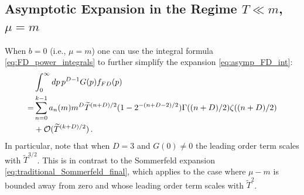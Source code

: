\documentclass[sn-mathphys,Numbered]{sn-jnl}
\begin{document}
\subsection{Asymptotic Expansion in the Regime $T\ll m$, $\mu=m$}\label{sec:b_0}
When $b=0$ (i.e., $\mu=m$) one can use the integral formula \eqref{eq:FD_power_integrals} to further simplify the expansion \eqref{eq:asymp_FD_int}:
\begin{align}\label{eq:asymp_FD_int_b_0}
&\int_0^\infty dp\, p^{D-1} G(p) f_{FD}(p)\notag\\
   =&\sum_{n=0}^{k-1} a_n(m)m^{D}\widetilde{T}^{(n+D)/2}(1-2^{-(n+D-2)/2})\Gamma((n+D)/2)\zeta((n+D)/2)\\
   &+\mathcal{O}(\widetilde{T}^{(k+D)/2})\,.\notag
\end{align}
In particular, note that when $D=3$ and $G(0)\neq 0$ the leading order term scales with $\widetilde{T}^{3/2}$.  This is in contrast to the  Sommerfeld expansion \eqref{eq:traditional_Sommerfeld_final}, which  applies to the case where $\mu-m$ is bounded away from zero and whose leading order term scales with $\widetilde{T}^2$.
\end{document}
